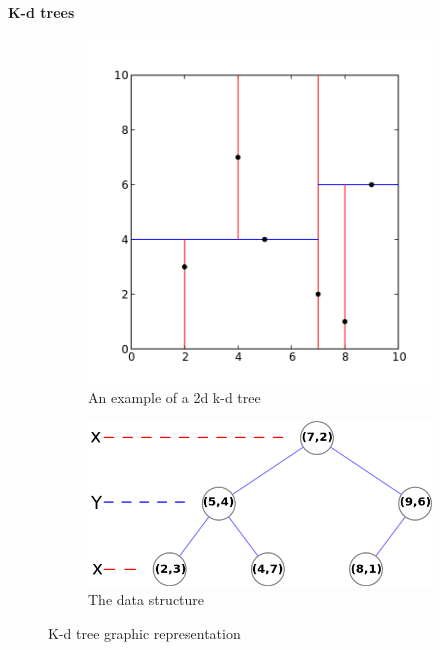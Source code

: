 \documentclass[12pt]{article}
\begin{document}
	\paragraph{K-d trees}
	\begin{figure}[h]
		\centering
		\begin{subfigure}{.5\textwidth}
			\centering
			\includegraphics[width=.9\linewidth]{resources/Kdtree_2d.png}
			\caption{An example of a 2d k-d tree\cite{KdTreeFig1}}
		\end{subfigure}%
		\begin{subfigure}{.5\textwidth}
			\centering
			\includegraphics[width=.9\linewidth]{resources/Tree_0001.png}
			\caption{The data structure\cite{KdTreeFig2}}
		\end{subfigure}
		\caption{K-d tree graphic representation}
		\label{fig:kdtree}
	\end{figure}
	
\end{document}
